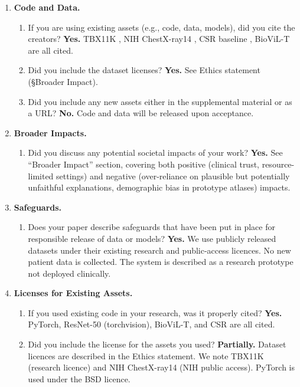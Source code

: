 \documentclass{article}
\begin{document}
\begin{enumerate}
\item \textbf{Code and Data.}
\begin{enumerate}
  \item If you are using existing assets (e.g., code, data, models), did you cite the creators? \textbf{Yes.} TBX11K \cite{chen2020tbx11k}, NIH ChestX-ray14 \cite{wang2017chestxray14}, CSR baseline \cite{csr2025}, BioViL-T \cite{bannur2023biovilt} are all cited.
  \item Did you include the dataset licenses? \textbf{Yes.} See Ethics statement (§Broader Impact).
  \item Did you include any new assets either in the supplemental material or as a URL? \textbf{No.} Code and data will be released upon acceptance.
\end{enumerate}

\item \textbf{Broader Impacts.}
\begin{enumerate}
  \item Did you discuss any potential societal impacts of your work? \textbf{Yes.} See ``Broader Impact'' section, covering both positive (clinical trust, resource-limited settings) and negative (over-reliance on plausible but potentially unfaithful explanations, demographic bias in prototype atlases) impacts.
\end{enumerate}

\item \textbf{Safeguards.}
\begin{enumerate}
  \item Does your paper describe safeguards that have been put in place for responsible release of data or models? \textbf{Yes.} We use publicly released datasets under their existing research and public-access licences. No new patient data is collected. The system is described as a research prototype not deployed clinically.
\end{enumerate}

\item \textbf{Licenses for Existing Assets.}
\begin{enumerate}
  \item If you used existing code in your research, was it properly cited? \textbf{Yes.} PyTorch, ResNet-50 (torchvision), BioViL-T, and CSR are all cited.
  \item Did you include the license for the assets you used? \textbf{Partially.} Dataset licences are described in the Ethics statement. We note TBX11K (research licence) and NIH ChestX-ray14 (NIH public access). PyTorch is used under the BSD licence.
\end{enumerate}


\end{enumerate}
\end{document}
